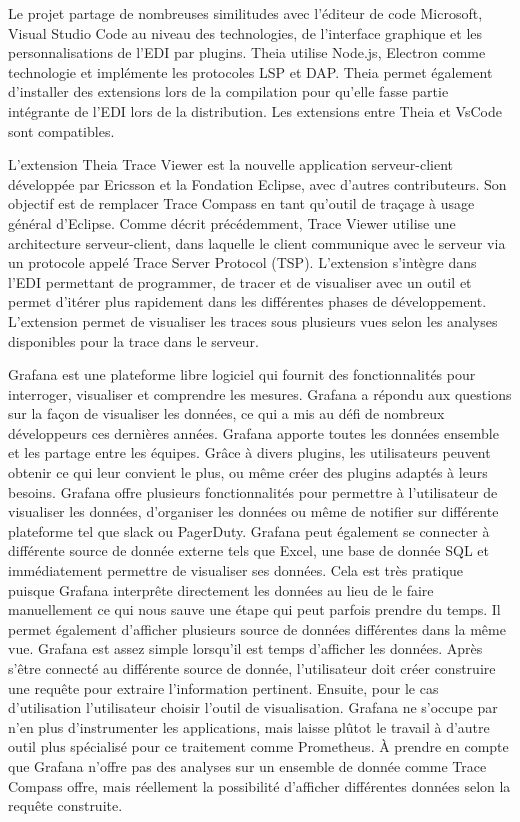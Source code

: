 Le projet partage de nombreuses similitudes avec l'éditeur de code Microsoft, Visual Studio Code au niveau des technologies, de l'interface graphique et les personnalisations de l'EDI par plugins. Theia utilise Node.js, Electron comme technologie et implémente les protocoles LSP et DAP. Theia permet également d'installer des extensions lors de la compilation pour qu'elle fasse partie intégrante de l'EDI lors de la distribution. Les extensions entre Theia et VsCode sont compatibles.

L'extension Theia Trace Viewer est la nouvelle application serveur-client développée par Ericsson et la Fondation Eclipse, avec d'autres contributeurs. Son objectif est de remplacer Trace Compass en tant qu'outil de traçage à usage général d'Eclipse. Comme décrit précédemment, Trace Viewer utilise une architecture serveur-client, dans laquelle le client communique avec le serveur via un protocole appelé Trace Server Protocol (TSP). \cite{desnoyers2006lttng} L'extension s'intègre dans l'EDI permettant de programmer, de tracer et de visualiser avec un outil et permet d'itérer plus rapidement dans les différentes phases de développement. L'extension permet de visualiser les traces sous plusieurs vues selon les analyses disponibles pour la trace dans le serveur.

Grafana est une plateforme libre logiciel qui fournit des fonctionnalités pour interroger, visualiser et comprendre les mesures. Grafana a répondu aux questions sur la façon de visualiser les données, ce qui a mis au défi de nombreux développeurs ces dernières années. Grafana apporte toutes les données ensemble et les partage entre les équipes. Grâce à divers plugins, les utilisateurs peuvent obtenir ce qui leur convient le plus, ou même créer des plugins adaptés à leurs besoins. Grafana offre plusieurs fonctionnalités pour permettre à l'utilisateur de visualiser les données, d'organiser les données ou même de notifier sur différente plateforme tel que slack ou PagerDuty. Grafana peut également se connecter à différente source de donnée externe tels que Excel, une base de donnée SQL et immédiatement permettre de visualiser ses données. Cela est très pratique puisque Grafana interprête directement les données au lieu de le faire manuellement ce qui nous sauve une étape qui peut parfois prendre du temps. Il permet également d'afficher plusieurs source de données différentes dans la même vue. Grafana est assez simple lorsqu'il est temps d'afficher les données. Après s'être connecté au différente source de donnée, l'utilisateur doit créer construire une requête pour extraire l'information pertinent. Ensuite, pour le cas d'utilisation l'utilisateur choisir l'outil de visualisation. \cite{do2021data} Grafana ne s'occupe par n'en plus d'instrumenter les applications, mais laisse plûtot le travail à d'autre outil plus spécialisé pour ce traitement comme Prometheus. À prendre en compte que Grafana n'offre pas des analyses sur un ensemble de donnée comme Trace Compass offre, mais réellement la possibilité d'afficher différentes données selon la requête construite.


